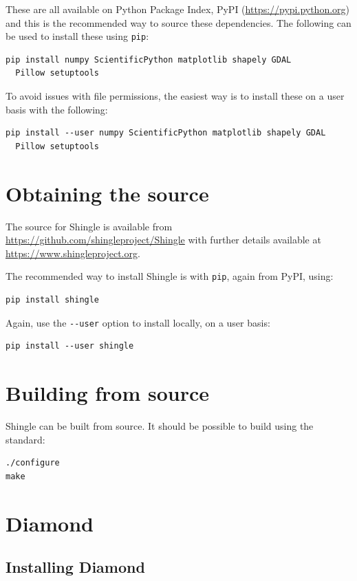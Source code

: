 \documentclass[a4paper, 10pt]{book}
\providecommand{\shingle}{Shingle\xspace}
\begin{document}
\noindent
These are all available on Python Package Index, PyPI
(\url{https://pypi.python.org})
and this is the recommended way to source these dependencies.
The following can be used to install these using \verb+pip+:
\begin{verbatim}
pip install numpy ScientificPython matplotlib shapely GDAL
  Pillow setuptools
\end{verbatim}

\noindent
To avoid issues with file permissions, the easiest way is to install these on a user basis with the following:
\begin{verbatim}
pip install --user numpy ScientificPython matplotlib shapely GDAL
  Pillow setuptools
\end{verbatim}

\section{Obtaining the source}

\noindent
The source for \shingle is available from
\url{https://github.com/shingleproject/Shingle}
with further details available at
\url{https://www.shingleproject.org}.

\noindent
The recommended way to install \shingle is with \verb+pip+, again from PyPI, using:
\begin{verbatim}
pip install shingle 
\end{verbatim}

\noindent
Again, use the \verb+--user+ option to install locally, on a user basis:
\begin{verbatim}
pip install --user shingle 
\end{verbatim}

\section{Building from source}

\shingle can be built from source.  It should be possible to build using the standard:
\begin{verbatim}
./configure
make
\end{verbatim}

\section{Diamond}

\subsection{Installing Diamond}
\end{document}
